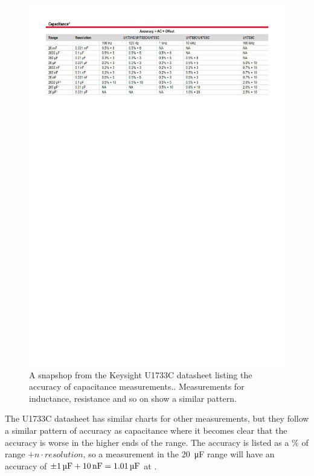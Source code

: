 \begin{figure}[H]
    \centering
    \includegraphics[clip, trim=0 630 0 0, width=1\textwidth]{Sections/2_ProblemAnalysis/FIgures/U1733CAccuracyDatasheet.pdf}
    \caption{A snapshop from the Keysight U1733C datasheet listing the accuracy of capacitance measurements.\cite{KeysightU1733CDatasheet}. Measurements for inductance, resistance and so on show a similar pattern.}
    \label{fig:2_2_U1733CCapAccurancy}
\end{figure}

The U1733C datasheet has similar charts for other measurements, but they follow a similar pattern of accuracy as capacitance where it becomes clear that the accuracy is worse in the higher ends of the range. The accuracy is listed as a $\%$ of range $ + n\cdot resolution$, so a measurement in the \SI[]{20}{\micro\farad} range will have an accuracy of $\pm \SI[]{1}{\micro\farad} + \SI[]{10}{\nano\farad} = \SIQ{1.01}{\micro\farad}$ at .

